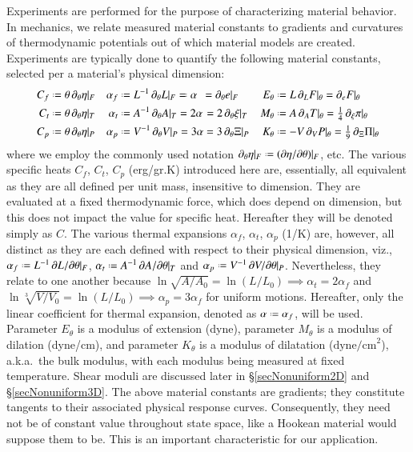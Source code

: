 Experiments are performed for the purpose of characterizing material behavior.  In mechanics, we relate measured material constants to gradients and curvatures of thermo\-dynamic potentials out of which material models are created.  Experiments are typically done to quantify the following material constants, selected per a material's physical dimension:
\begin{subequations}
\label{materialConstants}
\begin{align}
C_f & \defeq \theta \, \partial_{\theta} \eta |_F & 
\alpha_f & \defeq L^{-1} \, \partial_{\theta} L |_F \eqdef \alpha \:\: =
\partial_{\theta} e |_F &
E_{\theta} & \defeq L \, \partial_L F |_{\theta} = 
\partial_e F |_{\theta} \\
C_t & \defeq \theta \, \partial_{\theta} \eta |_T & 
\alpha_t & \defeq A^{-1} \, \partial_{\theta} A |_T = 2 \alpha \hspace{1pt} =
2 \, \partial_{\theta} \xi |_T &
M_{\theta} & \defeq A \, \partial_A T |_{\theta} = 
\tfrac{1}{4} \, \partial_{\xi} \pi |_{\theta} \\
C_p & \defeq \theta \, \partial_{\theta} \eta |_P & 
\alpha_p & \defeq V^{-1} \, \partial_{\theta} V |_P = 3 \alpha =
3 \, \partial_{\theta} \Xi |_P &
K_{\theta} & \defeq -V \, \partial_V P |_{\theta} = 
\tfrac{1}{9} \, \partial_{\Xi} \Pi |_{\theta}
\end{align}
\end{subequations}
where we employ the commonly used notation $\partial_{\theta} \eta |_F \defeq ( \partial \eta / \partial \theta ) |_F$, etc.  The various specific heats $C_f$, $C_t$, $C_p$ (erg/gr.K) introduced here are, essentially, all equivalent as they are all defined per unit mass, insensitive to dimension.  They are evaluated at a fixed thermo\-dynamic force, which does depend on dimension, but this does not impact the value for specific heat.  Hereafter they will be denoted simply as $C$.  The various thermal expansions $\alpha_f$, $\alpha_t$, $\alpha_p$ (1/K) are, however, all distinct as they are each defined with respect to their physical dimension, viz., $\alpha_f \defeq L^{-1} \, \partial L / \partial \theta |_F$, $\alpha_t \defeq A^{-1} \, \partial A / \partial \theta |_T$ and $\alpha_p \defeq V^{-1} \, \partial V / \partial \theta |_P$.  Nevertheless, they relate to one another because $\ln \sqrt{A / \! A_0} = \ln (L / L_0) \implies \alpha_t = 2 \alpha_f$ and $\ln \sqrt[3]{V \! / V_0} = \ln (L / L_0) \implies \alpha_p = 3 \alpha_f$ for uniform motions.  Hereafter, only the linear coefficient for thermal expansion, denoted as $\alpha \defeq \alpha_f$, will be used.  Parameter $E_{\theta}$ is a modulus of extension (dyne), parameter $M_{\theta}$ is a modulus of dilation (dyne/cm), and parameter $K_{\theta}$ is a modulus of dilatation ($\mathrm{dyne/cm}^2$), a.k.a.\ the bulk modulus, with each modulus being measured at fixed temperature.  Shear moduli are discussed later in \S\ref{secNonuniform2D} and \S\ref{secNonuniform3D}.  The above material constants are gradients; they constitute tangents to their associated physical response curves.  Consequently, they need not be of constant value throughout state space, like a Hookean material would suppose them to be.  This is an important characteristic for our application. 

